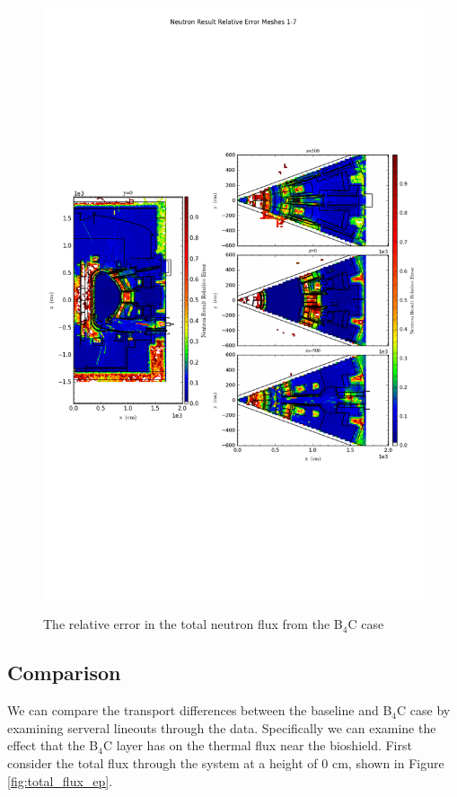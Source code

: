 \documentclass[12pt]{article}
\begin{document}
\begin{figure}[ht!]
  \centering
  \includegraphics[trim={0cm 9cm 0cm 10cm},clip,scale=0.75]{../plots/final_model_with_b4c/Neutron_Result_Relative_Error_Meshes_1-7.png}     
  \label{fig:neutrons_no4bc_relerr}
  \caption{The relative error in the total neutron flux from the B$_4$C case}
\end{figure}

\newpage
\clearpage
\subsection{Comparison}
We can compare the transport differences between the baseline and B$_4$C case 
by examining serveral lineouts through the data. Specifically we can examine
the effect that the B$_4$C layer has on the thermal flux near the bioshield. 
First consider the total flux through the system at a height of 0 cm, shown
in Figure \ref{fig:total_flux_ep}. 
\end{document}
